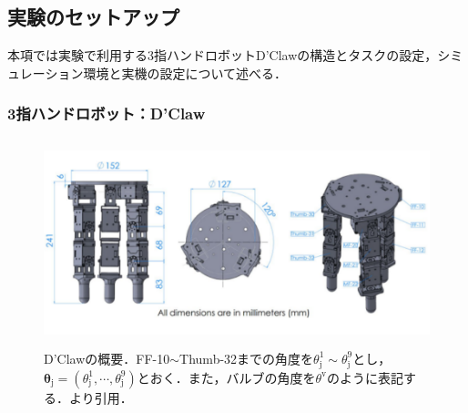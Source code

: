 \documentclass[dvipdfmx]{ampbt_nomag}
\begin{document}
\subsection{実験のセットアップ}
本項では実験で利用する3指ハンドロボットD'Clawの構造とタスクの設定，シミュレーション環境と実機の設定について述べる．

\subsubsection{3指ハンドロボット：D'Claw}
\begin{figure}[hbtp]
  \centering
  \includegraphics[height=6cm]
       {asset/img/dclaw.pdf}
  \caption{D'Clawの概要．FF-10$\sim$Thumb-32までの角度を$\theta^1_{\textrm{j}}\sim\theta^9_{\textrm{j}}$とし，$\boldsymbol{\theta}_{\textrm{j}}=(\theta^1_{\textrm{j}},\cdots,\theta^9_{\textrm{j}})$とおく．また，バルブの角度を$\theta^{\textrm{v}}$のように表記する．\cite{ahn2020robel}より引用．}
  \label{dclaw_structure}
\end{figure}
\end{document}
